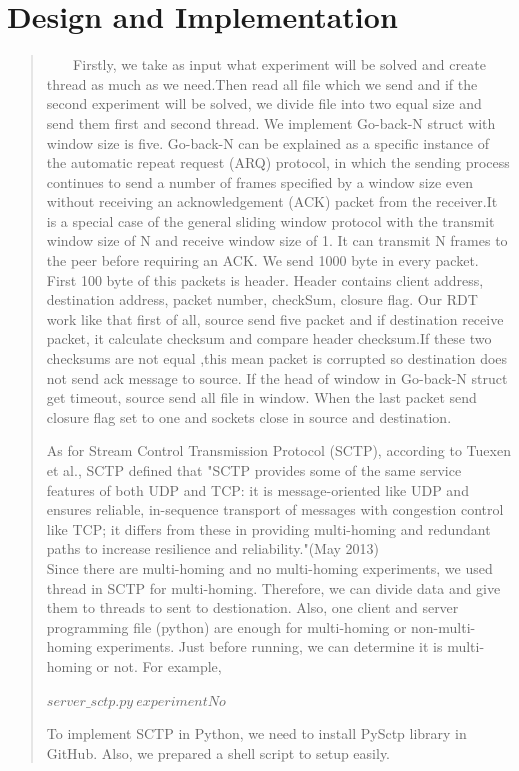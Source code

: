 \documentclass[12pt]{article}
\begin{document}
\section*{Design and Implementation}
\begin{quote}
$\ \  \ \ \ \ \ $ Firstly, we take as input what experiment will be solved and create  thread as much as we need.Then read all file which we send and if the second experiment will be solved, we divide file into two equal size and send them first and second thread. We implement Go-back-N struct with window size is five. Go-back-N can be explained as a specific instance of the automatic repeat request (ARQ) protocol, in which the sending process continues to send a number of frames specified by a window size even without receiving an acknowledgement (ACK) packet from the receiver.It is a special case of the general sliding window protocol with the transmit window size of N and receive window size of 1. It can transmit N frames to the peer before requiring an ACK. We send 1000 byte in every packet. First 100 byte of this packets is header. Header contains client address, destination address, packet number, checkSum, closure flag. Our RDT work like that first of all, source send five packet and if destination receive packet, it calculate checksum and compare header checksum.If these two checksums  are not equal ,this mean packet is corrupted so destination does not send ack message to source. If the head of window in Go-back-N struct get timeout, source send all file in window. When the last packet send closure flag set to one and sockets close in source and destination.

As for Stream Control Transmission Protocol (SCTP), according to  Tuexen et al., SCTP defined that "SCTP provides some of the same service features of both UDP and TCP: it is message-oriented like UDP and ensures reliable, in-sequence transport of messages with congestion control like TCP; it differs from these in providing multi-homing and redundant paths to increase resilience and reliability."(May 2013)\\
Since there are multi-homing and no multi-homing experiments, we used thread in SCTP for multi-homing. Therefore, we can divide data and give them to threads to sent to destionation. Also, one client and server programming file (python) are enough for multi-homing or non-multi-homing experiments. Just before running, we can determine it is multi-homing or not. For example, \\
\begin{center}
$ server\_sctp.py\ experimentNo$
\end{center}
To implement SCTP in Python, we need to install PySctp library in GitHub. Also, we prepared a shell script to setup easily.
  

  
\end{quote}
\end{document}
